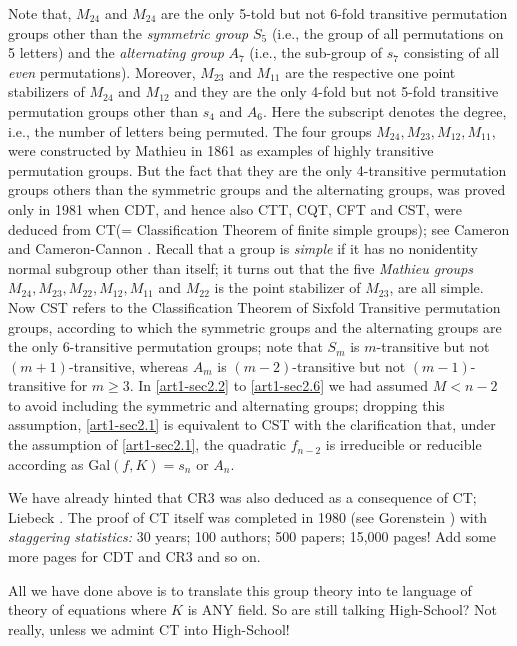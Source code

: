 Note that, $M_{24}$ and $M_{24}$ are the only 5-told but not 6-fold transitive permutation groups other than the {\it symmetric group} $S_{5}$ (i.e., the group of all permutations on 5 letters) and the {\it alternating group} $A_{7}$ (i.e., the  sub-group of $s_{7}$ consisting of all {\it even} permutations). Moreover, $M_{23}$ and $M_{11}$ are the respective one point stabilizers of $M_{24}$ and $M_{12}$ and they are the only 4-fold but not 5-fold transitive permutation groups other than $s_{4}$ and $A_{6}$. Here the subscript denotes the degree, i.e., the number of letters being permuted. The four groups $M_{24}, M_{23}, M_{12}, M_{11}$, were constructed by Mathieu \cite{art1-key46} in 1861 as examples of highly transitive permutation groups. But the fact that they are the only 4-transitive permutation groups others than the symmetric groups and the alternating groups, was proved only in 1981 when CDT, and hence also CTT, CQT, CFT and CST, were deduced from  CT(= Classification Theorem of finite simple groups); see Cameron \cite{art1-key23} and Cameron-Cannon \cite{art1-key24}. Recall that a group is {\it simple} if it has no nonidentity normal subgroup other than itself; it turns out that the five {\it Mathieu groups} $M_{24}, M_{23}, M_{22}, M_{12}, M_{11}$ and $M_{22}$ is the point stabilizer of $M_{23}$, are all simple. Now CST refers to the Classification Theorem of Sixfold Transitive permutation groups, according to which the symmetric groups and the alternating groups are the only 6-transitive permutation groups; note that $S_{m}$ is $m$-transitive but not $(m+1)$-transitive, whereas $A_{m}$ is $(m-2)$-transitive but not $(m-1)$-transitive for $m\geq 3$. In \ref{art1-sec2.2} to \ref{art1-sec2.6} we had assumed $M<n-2$ to avoid including the symmetric and alternating groups; dropping this assumption, \ref{art1-sec2.1} is equivalent to CST with the clarification that, under the assumption of \ref{art1-sec2.1}, the quadratic $f_{n-2}$ is irreducible or reducible according as Gal$(f, K) = s_{n}$ or $A_{n}$.

We have already hinted that CR3 was also deduced as a consequence of CT; Liebeck \cite{art1-key44}. The proof of CT itself was completed in 1980 (see Gorenstein \cite{art1-key32}) with {\it staggering statistics:} 30 years; 100 authors; 500 papers; 15,000 pages! Add some more pages for CDT and CR3 and so on.

All we have done above is to translate this group theory into te language of theory of equations where $K$ is ANY field. So are still talking High-School? Not really, unless we admint CT into High-School!
  
